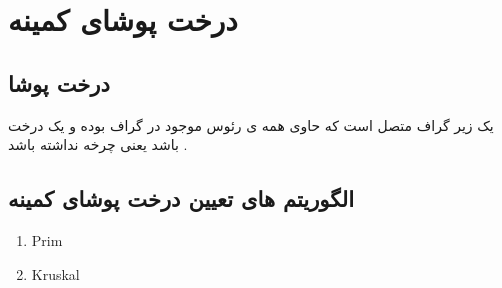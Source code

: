 \documentclass[12pt]{book}
\begin{document}
\section{درخت پوشای کمینه
}



\subsection{درخت پوشا}

یک زیر گراف متصل است که حاوی همه ی رئوس موجود در گراف بوده و یک درخت باشد یعنی چرخه نداشته باشد .


\subsection{الگوریتم های تعیین درخت پوشای کمینه}

\begin{latin}
\begin{enumerate}
	\item Prim
	\item Kruskal
\end{enumerate}
\end{latin}
\end{document}
